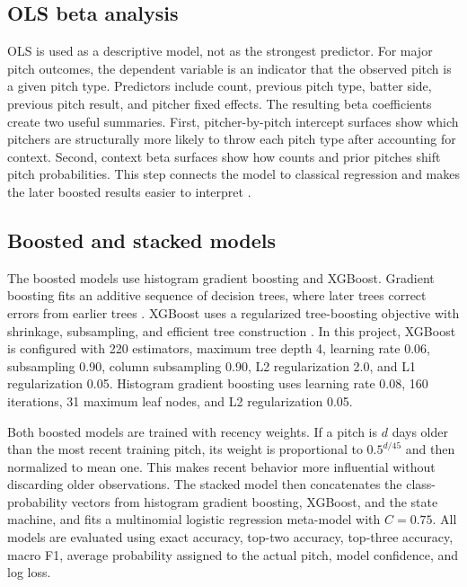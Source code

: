 \documentclass[9pt,twoside]{pnas-new}
\begin{document}
\subsection*{OLS beta analysis}

OLS is used as a descriptive model, not as the strongest predictor. For major pitch outcomes, the dependent variable is an indicator that the observed pitch is a given pitch type. Predictors include count, previous pitch type, batter side, previous pitch result, and pitcher fixed effects. The resulting beta coefficients create two useful summaries. First, pitcher-by-pitch intercept surfaces show which pitchers are structurally more likely to throw each pitch type after accounting for context. Second, context beta surfaces show how counts and prior pitches shift pitch probabilities. This step connects the model to classical regression and makes the later boosted results easier to interpret \cite{wooldridge2010econometric}.

\subsection*{Boosted and stacked models}

The boosted models use histogram gradient boosting and XGBoost. Gradient boosting fits an additive sequence of decision trees, where later trees correct errors from earlier trees \cite{friedman2001greedy}. XGBoost uses a regularized tree-boosting objective with shrinkage, subsampling, and efficient tree construction \cite{chen2016xgboost}. In this project, XGBoost is configured with 220 estimators, maximum tree depth 4, learning rate 0.06, subsampling 0.90, column subsampling 0.90, L2 regularization 2.0, and L1 regularization 0.05. Histogram gradient boosting uses learning rate 0.08, 160 iterations, 31 maximum leaf nodes, and L2 regularization 0.05.

Both boosted models are trained with recency weights. If a pitch is $d$ days older than the most recent training pitch, its weight is proportional to $0.5^{d/45}$ and then normalized to mean one. This makes recent behavior more influential without discarding older observations. The stacked model then concatenates the class-probability vectors from histogram gradient boosting, XGBoost, and the state machine, and fits a multinomial logistic regression meta-model with $C=0.75$. All models are evaluated using exact accuracy, top-two accuracy, top-three accuracy, macro F1, average probability assigned to the actual pitch, model confidence, and log loss.
\end{document}
